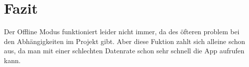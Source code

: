 \chapter{Fazit}
\thispagestyle{standard}
\pagestyle{standard}
\renewcommand{\footrulewidth}{0.4pt}

Der Offline Modus funktioniert leider nicht immer, da des öfteren problem bei den Abhängigkeiten im Projekt gibt. Aber diese Fuktion zahlt sich alleine schon aus, 
da man mit einer schlechten Datenrate schon sehr schnell die App aufrufen kann.